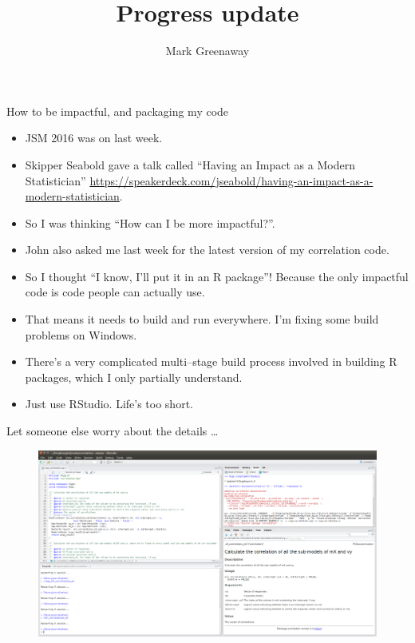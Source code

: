 \documentclass{beamer}
\title{Progress update}
\author{Mark Greenaway}
\begin{document}
\begin{frame}
\titlepage
\end{frame}

\begin{frame}{How to be impactful, and packaging my code}
\begin{itemize}
\item JSM 2016 was on last week.
\item Skipper Seabold gave a talk called ``Having an Impact as a Modern Statistician'' \url{https://speakerdeck.com/jseabold/having-an-impact-as-a-modern-statistician}.
\item So I was thinking ``How can I be more impactful?''.
\item John also asked me last week for the latest version of my correlation code.
\item So I thought ``I know, I'll put it in an R package''! Because the only impactful code is code people can
actually use.
\item That means it needs to build and run everywhere. I'm fixing some build problems on Windows.
\item There's a very complicated multi--stage build process involved in building R packages, which I only 
partially understand.
\item Just use RStudio. Life's too short.
\end{itemize}
\end{frame}

\begin{frame}{Let someone else worry about the details \ldots}
\begin{figure}
\includegraphics[scale=0.2]{Screenshot_of_R_package_development.png}
\end{figure}
\end{frame}
\end{document}
